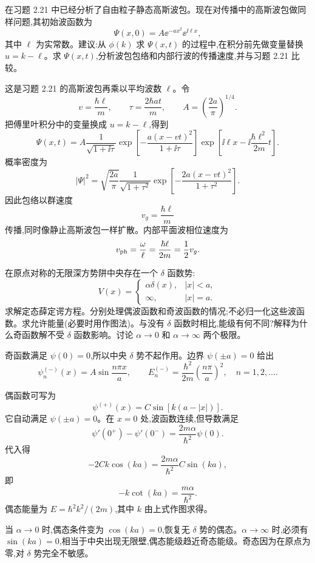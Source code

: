 \begin{question}
在习题 2.21 中已经分析了自由粒子静态高斯波包。现在对传播中的高斯波包做同样问题,其初始波函数为
\[
\Psi(x,0)=A\ee^{-ax^2}\ee^{\ii\ell x},
\]
其中 $\ell$ 为实常数。建议:从 $\phi(k)$ 求 $\Psi(x,t)$ 的过程中,在积分前先做变量替换 $u=k-\ell$。求 $\Psi(x,t)$,分析波包包络和内部行波的传播速度,并与习题 2.21 比较。
\end{question}
\begin{solution}
这是习题 2.21 的高斯波包再乘以平均波数 $\ell$。令
\[
v=\frac{\hbar\ell}{m},
\qquad
\tau=\frac{2\hbar at}{m},
\qquad
A=\left(\frac{2a}{\pi}\right)^{1/4}.
\]
把傅里叶积分中的变量换成 $u=k-\ell$,得到
\[
\Psi(x,t)=A\frac1{\sqrt{1+\ii\tau}}
\exp\left[-\frac{a(x-vt)^2}{1+\ii\tau}\right]
\exp\left[\ii\ell x-\ii\frac{\hbar\ell^2}{2m}t\right].
\]
概率密度为
\[
|\Psi|^2=\sqrt{\frac{2a}{\pi}}\frac1{\sqrt{1+\tau^2}}
\exp\left[-\frac{2a(x-vt)^2}{1+\tau^2}\right].
\]
因此包络以群速度
\[
v_g=\frac{\hbar\ell}{m}
\]
传播,同时像静止高斯波包一样扩散。内部平面波相位速度为
\[
v_{\rm ph}=\frac{\omega}{\ell}=\frac{\hbar\ell}{2m}=\frac12v_g.
\]
\end{solution}

\begin{question}
在原点对称的无限深方势阱中央存在一个 $\delta$ 函数势:
\[
V(x)=\begin{cases}\alpha\delta(x),& |x|<a,\\ \infty,& |x|=a.
\end{cases}
\]
求解定态薛定谔方程。分别处理偶波函数和奇波函数的情况;不必归一化这些波函数。求允许能量(必要时用作图法)。与没有 $\delta$ 函数时相比,能级有何不同?解释为什么奇函数解不受 $\delta$ 函数影响。讨论 $\alpha\to0$ 和 $\alpha\to\infty$ 两个极限。
\end{question}
\begin{solution}
奇函数满足 $\psi(0)=0$,所以中央 $\delta$ 势不起作用。边界 $\psi(\pm a)=0$ 给出
\[
\psi_n^{(-)}(x)=A\sin\frac{n\pi x}{a},
\qquad
E_n^{(-)}=\frac{\hbar^2}{2m}\left(\frac{n\pi}{a}\right)^2,
\quad n=1,2,\ldots.
\]

偶函数可写为
\[
\psi^{(+)}(x)=C\sin[k(a-|x|)].
\]
它自动满足 $\psi(\pm a)=0$。在 $x=0$ 处,波函数连续,但导数满足
\[
\psi'(0^+)-\psi'(0^-)=\frac{2m\alpha}{\hbar^2}\psi(0).
\]
代入得
\[
-2Ck\cos(ka)=\frac{2m\alpha}{\hbar^2}C\sin(ka),
\]
即
\[
-k\cot(ka)=\frac{m\alpha}{\hbar^2}.
\]
偶态能量为 $E=\hbar^2k^2/(2m)$,其中 $k$ 由上式作图求得。

当 $\alpha\to0$ 时,偶态条件变为 $\cos(ka)=0$,恢复无 $\delta$ 势的偶态。$\alpha\to\infty$ 时,必须有 $\sin(ka)=0$,相当于中央出现无限壁,偶态能级趋近奇态能级。奇态因为在原点为零,对 $\delta$ 势完全不敏感。
\end{solution}

